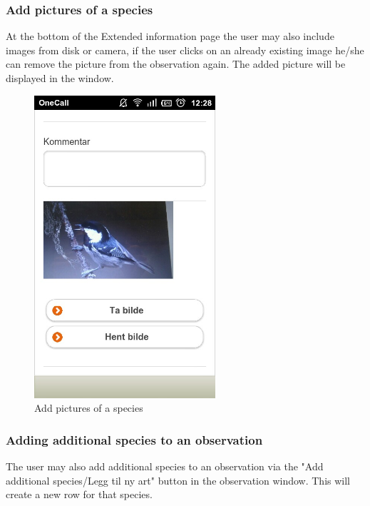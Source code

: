 \pagebreak


\subsubsection{Add pictures of a species}
At the bottom of the Extended information page the user may also include images from disk or camera, if the user clicks on an already existing image he/she can remove the picture from the observation again. The added picture will be displayed in the window.

\begin{figure}[h!]
\centering
 \includegraphics[width=0.6\textwidth,height=0.9\textwidth]{appendix/pic/bilde.jpg} 
 \caption{Add pictures of a species}
 \end{figure}

\pagebreak

\subsubsection{Adding additional species to an observation}
The user may also add additional species to an observation via the "Add additional species/Legg til ny art" button in the  observation window. This will create a new row for that species.

